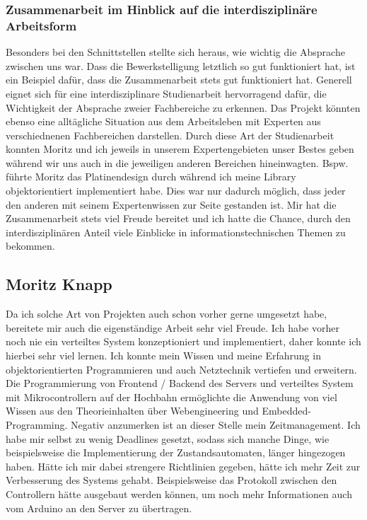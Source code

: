 \subsubsection{Zusammenarbeit im Hinblick auf die interdisziplinäre Arbeitsform}
Besonders bei den Schnittstellen stellte sich heraus, wie wichtig die Absprache zwischen uns war. Dass die Bewerkstelligung letztlich so gut funktioniert hat, ist ein Beispiel dafür, dass die Zusammenarbeit stets gut funktioniert hat. Generell eignet sich für eine interdisziplinare Studienarbeit hervorragend dafür, die Wichtigkeit der Absprache zweier Fachbereiche zu erkennen. Das Projekt könnten ebenso eine alltägliche Situation aus dem Arbeitsleben mit Experten aus verschiednenen Fachbereichen darstellen. Durch diese Art der Studienarbeit konnten Moritz und ich jeweils in unserem Expertengebieten unser Bestes geben während wir uns auch in die jeweiligen anderen Bereichen hineinwagten. Bspw. führte Moritz das Platinendesign durch während ich meine Library objektorientiert implementiert habe. Dies war nur dadurch möglich, dass jeder den anderen mit seinem Expertenwissen zur Seite gestanden ist. Mir hat die Zusammenarbeit stets viel Freude bereitet und ich hatte die Chance, durch den interdisziplinären Anteil viele Einblicke in informationstechnischen Themen zu bekommen. 


\subsection{Moritz Knapp}
Da ich solche Art von Projekten auch schon vorher gerne umgesetzt habe, bereitete mir auch die eigenständige Arbeit sehr viel Freude. Ich habe vorher noch nie ein verteiltes System konzeptioniert und implementiert, daher konnte ich hierbei sehr viel lernen. Ich konnte mein Wissen und meine Erfahrung in objektorientierten Programmieren und auch Netztechnik vertiefen und erweitern. Die Programmierung von Frontend / Backend des Servers und verteiltes System mit Mikrocontrollern auf der Hochbahn ermöglichte die Anwendung von viel Wissen aus den Theorieinhalten über Webengineering und Embedded-Programming. Negativ anzumerken ist an dieser Stelle mein Zeitmanagement. Ich habe mir selbst zu wenig Deadlines gesetzt, sodass sich manche Dinge, wie beispielsweise die Implementierung der Zustandsautomaten, länger hingezogen haben. Hätte ich mir dabei strengere Richtlinien gegeben, hätte ich mehr Zeit zur Verbesserung des Systems gehabt. Beispielsweise das Protokoll zwischen den Controllern hätte ausgebaut werden können, um noch mehr Informationen auch vom Arduino an den Server zu übertragen. 
